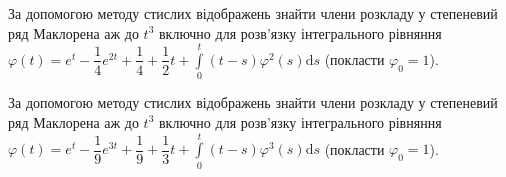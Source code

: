 \documentclass[12pt]{extarticle}
\begin{document}
\begin{Exercise}
За допомогою методу стислих відображень знайти члени розкладу у степеневий ряд Маклорена аж до $t^3$ включно для розв’язку інтегрального рівняння $\varphi (t) = e^t - \dfrac{1}{4} e^{2t} + \dfrac{1}{4} + \dfrac{1}{2} t + \int\limits_{0}^{t} (t-s) \varphi^2(s) \mathrm{d}s$ (покласти $\varphi_0 = 1$).
\end{Exercise}

\begin{Exercise}
За допомогою методу стислих відображень знайти члени розкладу у степеневий ряд Маклорена аж до $t^3$ включно для розв’язку інтегрального рівняння $\varphi (t) = e^t - \dfrac{1}{9} e^{3t} + \dfrac{1}{9} + \dfrac{1}{3} t + \int\limits_{0}^{t} (t-s) \varphi^3(s) \mathrm{d}s$ (покласти $\varphi_0 = 1$).
\end{Exercise}
\end{document}
